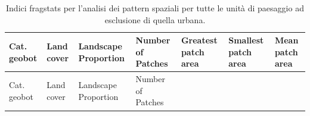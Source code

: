 \documentclass[
  a4paper,
]{book}
\begin{document}
\begin{longtable}[]{@{}
  >{\raggedright\arraybackslash}p{}
  >{\raggedright\arraybackslash}p{}
  >{\centering\arraybackslash}p{}
  >{\raggedright\arraybackslash}p{}
  >{\raggedright\arraybackslash}p{}
  >{\raggedright\arraybackslash}p{}
  >{\raggedright\arraybackslash}p{}@{}}
\caption{\label{tab:noUrb} Indici fragstats per l'analisi dei pattern spaziali per tutte le unità di paesaggio ad esclusione di quella urbana.}\tabularnewline
\toprule\noalign{}
\begin{minipage}[b]{\linewidth}\raggedright
Cat. geobot
\end{minipage} & \begin{minipage}[b]{\linewidth}\raggedright
Land cover
\end{minipage} & \begin{minipage}[b]{\linewidth}\centering
Landscape Proportion
\end{minipage} & \begin{minipage}[b]{\linewidth}\raggedright
Number of Patches
\end{minipage} & \begin{minipage}[b]{\linewidth}\raggedright
Greatest patch area
\end{minipage} & \begin{minipage}[b]{\linewidth}\raggedright
Smallest patch area
\end{minipage} & \begin{minipage}[b]{\linewidth}\raggedright
Mean patch area
\end{minipage} \\
\midrule\noalign{}
\endfirsthead
\toprule\noalign{}
\begin{minipage}[b]{\linewidth}\raggedright
Cat. geobot
\end{minipage} & \begin{minipage}[b]{\linewidth}\raggedright
Land cover
\end{minipage} & \begin{minipage}[b]{\linewidth}\centering
Landscape Proportion
\end{minipage} & \begin{minipage}[b]{\linewidth}\raggedright
Number of Patches
\end{minipage} & \begin{minipage}[b]{\linewidth}\raggedright

\end{minipage}
\end{longtable}
\end{document}
